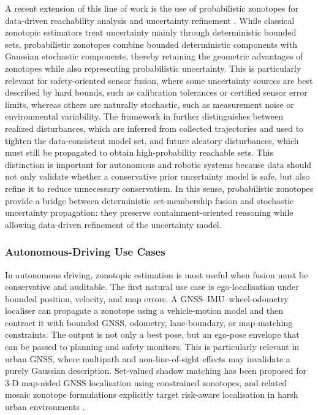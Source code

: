\documentclass{ieeeaccess}
\begin{document}
A recent extension of this line of work is the use of probabilistic zonotopes for data-driven reachability analysis and uncertainty refinement \cite{modares2026reachability}. While classical zonotopic estimators treat uncertainty mainly through deterministic bounded sets, probabilistic zonotopes combine bounded deterministic components with Gaussian stochastic components, thereby retaining the geometric advantages of zonotopes while also representing probabilistic uncertainty. This is particularly relevant for safety-oriented sensor fusion, where some uncertainty sources are best described by hard bounds, such as calibration tolerances or certified sensor error limits, whereas others are naturally stochastic, such as measurement noise or environmental variability. The framework in \cite{modares2026reachability} further distinguishes between realized disturbances, which are inferred from collected trajectories and used to tighten the data-consistent model set, and future aleatory disturbances, which must still be propagated to obtain high-probability reachable sets. This distinction is important for autonomous and robotic systems because data should not only validate whether a conservative prior uncertainty model is safe, but also refine it to reduce unnecessary conservatism. In this sense, probabilistic zonotopes provide a bridge between deterministic set-membership fusion and stochastic uncertainty propagation: they preserve containment-oriented reasoning while allowing data-driven refinement of the uncertainty model.

\subsubsection{Autonomous-Driving Use Cases}

In autonomous driving, zonotopic estimation is most useful when fusion must be conservative and auditable. The first natural use case is ego-localisation under bounded position, velocity, and map errors. A GNSS--IMU--wheel-odometry localiser can propagate a zonotope using a vehicle-motion model and then contract it with bounded GNSS, odometry, lane-boundary, or map-matching constraints. The output is not only a best pose, but an ego-pose envelope that can be passed to planning and safety monitors. This is particularly relevant in urban GNSS, where multipath and non-line-of-sight effects may invalidate a purely Gaussian description. Set-valued shadow matching has been proposed for 3-D map-aided GNSS localisation using constrained zonotopes, and related mosaic zonotope formulations explicitly target risk-aware localisation in harsh urban environments \cite{bhamidipati2022_zonotope_shadow_matching,neamati2023_mosaic_zonotope_shadow_matching}.
\end{document}
